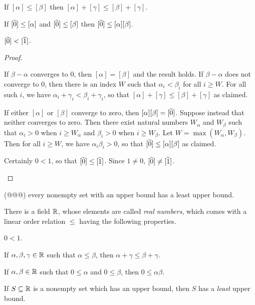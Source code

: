 \begin{prop}
\begin{proplist}
\item If \([\alpha] \leq [\beta]\) then \([\alpha] + [\gamma] \leq [\beta] + [\gamma]\).
\item If \([\widetilde{0}] \leq [\alpha]\) and \([\widetilde{0}] \leq [\beta]\) then \([\widetilde{0}] \leq [\alpha][\beta]\).
\item \([\widetilde{0}] < [\widetilde{1}]\).
\end{proplist}
\end{prop}

\begin{proof}
\begin{inlineproplist}
\item If \(\beta - \alpha\) converges to 0, then \([\alpha] = [\beta]\) and the result holds. If \(\beta - \alpha\) does not converge to 0, then there is an index \(W\) such that \(\alpha_i < \beta_i\) for all \(i \geq W\). For all such \(i\), we have \(\alpha_i + \gamma_i < \beta_i + \gamma_i\), so that \([\alpha] + [\gamma] \leq [\beta] + [\gamma]\) as claimed.
\item If either \([\alpha]\) or \([\beta]\) converge to zero, then \([\alpha][\beta] = [\widetilde{0}]\). Suppose instead that neither converges to zero. Then there exist natural numbers \(W_\alpha\) and \(W_\beta\) such that \(\alpha_i > 0\) when \(i \geq W_\alpha\) and \(\beta_i > 0\) when \(i \geq W_\beta\). Let \(W = \max(W_\alpha, W_\beta)\). Then for all \(i \geq W\), we have \(\alpha_i \beta_i > 0\), so that \([\widetilde{0}] \leq [\alpha][\beta]\) as claimed.
\item Certainly \(0 < 1\), so that \([\widetilde{0}] \leq [\widetilde{1}]\). Since \(1 \neq 0\), \([\widetilde{0}] \neq [\widetilde{1}]\).
\end{inlineproplist}
\end{proof}

\begin{prop}
(@@@) every nonempty set with an upper bound has a least upper bound.
\end{prop}

\begin{prop} \label{prop:rr-axioms}
There is a field \(\mathbb{R}\), whose elements are called \emph{real numbers}, which comes with a linear order relation \(\leq\) having the following properties.
\begin{proplist}
\item \(0 < 1\).
\item If \(\alpha, \beta, \gamma \in \mathbb{R}\) such that \(\alpha \leq \beta\), then \(\alpha + \gamma \leq \beta + \gamma\).
\item If \(\alpha, \beta \in \mathbb{R}\) such that \(0 \leq \alpha\) and \(0 \leq \beta\), then \(0 \leq \alpha\beta\).
\item If \(S \subseteq \mathbb{R}\) is a nonempty set which has an upper bound, then \(S\) has a \emph{least} upper bound.
\end{proplist}
\end{prop}

